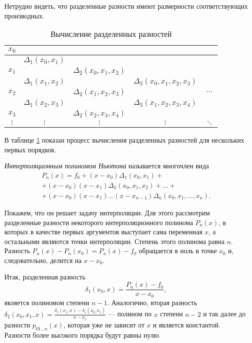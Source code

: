 Нетрудно видеть, что разделенные разности имеют размерности
соответствующих производных.
\begin{table}
\noindent \begin{centering}
\begin{tabular}{|c|c|c|c|c|}
\hline 
$x_{0}$ &  &  &  & \tabularnewline
\hline 
 & $\Delta_{1}(x_{0},x_{1})$ &  &  & \tabularnewline
\hline 
$x_{1}$ &  & $\Delta_{2}(x_{0},x_{1},x_{2})$ &  & \tabularnewline
\hline 
 & $\Delta_{1}(x_{1},x_{2})$ &  & $\Delta_{3}(x_{0},x_{1},x_{2},x_{3})$ & \tabularnewline
\hline 
$x_{2}$ &  & $\Delta_{2}(x_{1},x_{2},x_{3})$ &  & $\cdots$\tabularnewline
\hline 
 & $\Delta_{1}(x_{2},x_{3})$ &  & $\Delta_{3}(x_{1},x_{2},x_{3},x_{4})$ & \tabularnewline
\hline 
$x_{3}$ &  & $\Delta_{2}(x_{2},x_{3},x_{4})$ &  & \tabularnewline
\hline 
$\vdots$ & $\vdots$ & $\vdots$ & $\vdots$ & $\ddots$\tabularnewline
\hline 
\end{tabular}
\par\end{centering}

\caption{Вычисление разделенных разностей}
\label{tab:divdiff}
\end{table}

В таблице \ref{tab:divdiff} показан процесс вычисления разделенных
разностей для нескольких первых порядков.

\emph{Интерполяционным полиномом Ньютона} называется многочлен вида
\begin{multline*}
P_{n}(x)=f_{0}+(x-x_{0})\Delta_{1}(x_{0},x_{1})+\\
+(x-x_{0})(x-x_{1})\Delta_{2}(x_{0},x_{1},x_{2})+\dots+\\
+(x-x_{0})(x-x_{1})\dots(x-x_{n-1})\Delta_{n}(x_{0},x_{1},\dots,x_{n}).
\end{multline*}


Покажем, что он решает задачу интерполяции. Для этого рассмотрим
разделенные разности некоторого интерполяционного полинома $P_{n}(x)$,
в которых в качестве первых аргументов выступает сама переменная $x$,
а остальными являются точки интерполяции. Степень этого полинома равна
$n$. Разность $P_{n}(x)-P_{n}(x_{0})=P_{n}(x)-f_{0}$ обращается в ноль
в точке $x_{0}$ и, следовательно, делится на $x-x_{0}$.

Итак, разделенная разность
\[
\delta_{1}(x_{0},x)=\frac{P_{n}(x)-f_{0}}{x-x_{0}},
\]
является полиномом степени $n-1$. Аналогично, вторая разность
$\delta_{2}(x_{0},x_{1},x)=\frac{\delta_{1}(x_{1},x)-\delta_{1}(x_{0,}x_{1})}{x-x_{1}}$
--- полином по $x$ степени $n-2$ и так далее до разности $p_{01\dots
  n}(x)$, которая уже не зависит от $x$ и является
константой. Разности более высокого порядка будут равны нулю.

